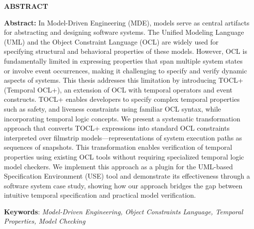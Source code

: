 \begin{center}
  \textbf{\large{ABSTRACT}	}
\end{center}


\begin{small}

\textbf{Abstract:} In Model-Driven Engineering (MDE), models serve as central artifacts 
for abstracting and designing software systems. The Unified Modeling Language (UML) and 
the Object Constraint Language (OCL) are widely used for specifying structural and 
behavioral properties of these models. However, OCL is fundamentally limited in expressing 
properties that span multiple system states or involve event occurrences, making it 
challenging to specify and verify dynamic aspects of systems. This thesis addresses this 
limitation by introducing TOCL+ (Temporal OCL+), an extension of OCL with temporal operators
and event constructs. TOCL+ enables developers to specify complex temporal properties such as
safety, and liveness constraints using familiar OCL syntax, while incorporating 
temporal logic concepts. We present a systematic transformation approach that converts
TOCL+ expressions into standard OCL constraints interpreted over filmstrip models—representations
of system execution paths as sequences of snapshots. This transformation enables verification 
of temporal properties using existing OCL tools without requiring specialized temporal logic
model checkers. We implement this approach as a plugin for the UML-based Specification 
Environment (USE) tool and demonstrate its effectiveness through a software system case study,
showing how our approach bridges the gap between intuitive temporal specification and 
practical model verification.
  


\textbf{Keywords}: \textit{Model-Driven Engineering, Object Constraints Language, Temporal Properties, Model Checking}
  
\end{small}

